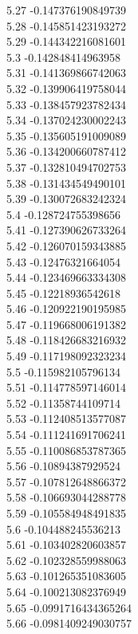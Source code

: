 {5.27	-0.147376190849739\\
5.28	-0.145851423193272\\
5.29	-0.144342216081601\\
5.3	-0.142848414963958\\
5.31	-0.141369866742063\\
5.32	-0.139906419758044\\
5.33	-0.138457923782434\\
5.34	-0.137024230002243\\
5.35	-0.135605191009089\\
5.36	-0.134200660787412\\
5.37	-0.132810494702753\\
5.38	-0.131434549490101\\
5.39	-0.130072683242324\\
5.4	-0.128724755398656\\
5.41	-0.127390626733264\\
5.42	-0.126070159343885\\
5.43	-0.12476321664054\\
5.44	-0.123469663334308\\
5.45	-0.12218936542618\\
5.46	-0.120922190195985\\
5.47	-0.119668006191382\\
5.48	-0.118426683216932\\
5.49	-0.117198092323234\\
5.5	-0.115982105796134\\
5.51	-0.114778597146014\\
5.52	-0.11358744109714\\
5.53	-0.112408513577087\\
5.54	-0.111241691706241\\
5.55	-0.110086853787365\\
5.56	-0.10894387929524\\
5.57	-0.107812648866372\\
5.58	-0.106693044288778\\
5.59	-0.105584948491835\\
5.6	-0.104488245536213\\
5.61	-0.103402820603857\\
5.62	-0.102328559988063\\
5.63	-0.101265351083605\\
5.64	-0.100213082376949\\
5.65	-0.0991716434365264\\
5.66	-0.0981409249030757\\
}

